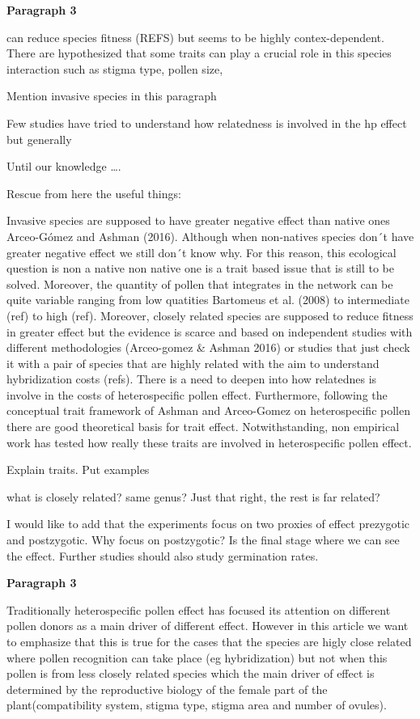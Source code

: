 \documentclass[11pt,a4paper]{article}
\begin{document}
\textbf{Paragraph 3}

can reduce species fitness (REFS) but seems to be highly
contex-dependent. There are hypothesized that some traits can play a
crucial role in this species interaction such as stigma type, pollen
size,

Mention invasive species in this paragraph

Few studies have tried to understand how relatedness is involved in the
hp effect but generally

Until our knowledge \ldots{}.

Rescue from here the useful things:

Invasive species are supposed to have greater negative effect than
native ones Arceo-Gómez and Ashman (2016). Although when non-natives
species don´t have greater negative effect we still don´t know why. For
this reason, this ecological question is non a native non native one is
a trait based issue that is still to be solved. Moreover, the quantity
of pollen that integrates in the network can be quite variable ranging
from low quatities Bartomeus et al. (2008) to intermediate (ref) to high
(ref). Moreover, closely related species are supposed to reduce fitness
in greater effect but the evidence is scarce and based on independent
studies with different methodologies (Arceo-gomez \& Ashman 2016) or
studies that just check it with a pair of species that are highly
related with the aim to understand hybridization costs (refs). There is
a need to deepen into how relatednes is involve in the costs of
heterospecific pollen effect. Furthermore, following the conceptual
trait framework of Ashman and Arceo-Gomez on heterospecific pollen there
are good theoretical basis for trait effect. Notwithstanding, non
empirical work has tested how really these traits are involved in
heterospecific pollen effect.

Explain traits. Put examples

what is closely related? same genus? Just that right, the rest is far
related?

I would like to add that the experiments focus on two proxies of effect
prezygotic and postzygotic. Why focus on postzygotic? Is the final stage
where we can see the effect. Further studies should also study
germination rates.

\textbf{Paragraph 3}

Traditionally heterospecific pollen effect has focused its attention on
different pollen donors as a main driver of different effect. However in
this article we want to emphasize that this is true for the cases that
the species are higly close related where pollen recognition can take
place (eg hybridization) but not when this pollen is from less closely
related species which the main driver of effect is determined by the
reproductive biology of the female part of the plant(compatibility
system, stigma type, stigma area and number of ovules).
\end{document}
